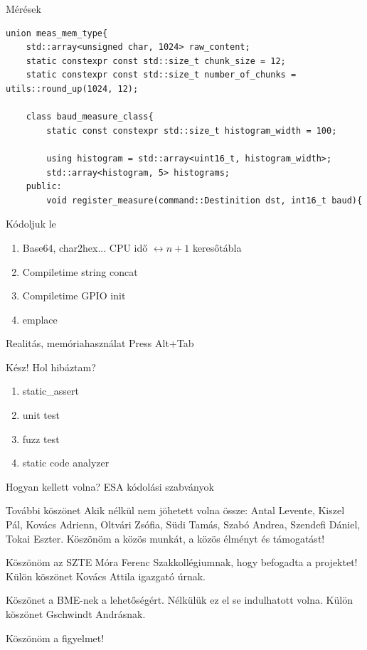 \documentclass[aspectratio=169,xcolor=dvipsnames]{beamer}
\begin{document}
\begin{frame}[fragile]{Mérések}
\begin{lstlisting}
union meas_mem_type{
    std::array<unsigned char, 1024> raw_content;
    static constexpr const std::size_t chunk_size = 12;
    static constexpr const std::size_t number_of_chunks = utils::round_up(1024, 12);

    class baud_measure_class{
        static const constexpr std::size_t histogram_width = 100;

        using histogram = std::array<uint16_t, histogram_width>;
        std::array<histogram, 5> histograms;
    public:
        void register_measure(command::Destinition dst, int16_t baud){
\end{lstlisting}
\end{frame}

\begin{frame}{Kódoljuk le}
	\begin{enumerate}
		\item Base64, char2hex... CPU idő $\leftrightarrow n+1$ keresőtábla
		\pause
		\item Compiletime string concat
		\item Compiletime GPIO init
		\item emplace
	\end{enumerate}
\end{frame}

\begin{frame}{Realitás, memóriahasználat}
Press Alt+Tab
\end{frame}

\begin{frame}{Kész! Hol hibáztam?}
	\begin{enumerate}
		\item static\_assert
		\item unit test
		\item fuzz test
		\item static code analyzer
	\end{enumerate}
\end{frame}

\begin{frame}{Hogyan kellett volna?}
	ESA kódolási szabványok
\end{frame}




\begin{frame}{További köszönet}
	Akik nélkül nem jöhetett volna össze: Antal Levente, Kiszel Pál, Kovács Adrienn, Oltvári Zsófia, Südi Tamás, Szabó Andrea, Szendefi Dániel, Tokai Eszter.
	Köszönöm a közös munkát, a közös élményt és támogatást!
	\vspace{1cm}
	\par Köszönöm az SZTE Móra Ferenc Szakkollégiumnak, hogy befogadta a projektet! Külön köszönet Kovács Attila igazgató úrnak.
	\vspace{1cm} \par Köszönet a BME-nek a lehetőségért. Nélkülük ez el se indulhatott volna. Külön köszönet Gschwindt Andrásnak.
\end{frame}

\begin{frame}
    \Huge{\centerline{Köszönöm a figyelmet!}}
\end{frame}
\end{document}
